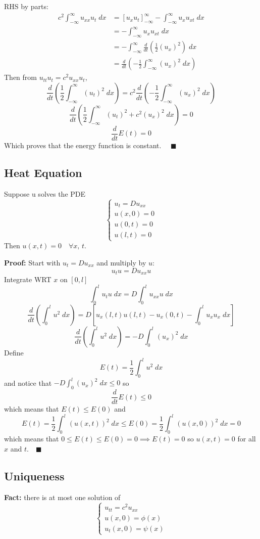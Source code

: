 \documentclass[12pt]{article}
\newcommand{\qed}{\quad \blacksquare}
\begin{document}
RHS by parts:
\begin{align*}
    c^2 \int_{-\infty}^{\infty} u_{xx} u_t \; dx &= [u_x u_t]_{-\infty}^\infty - \int_{-\infty}^{\infty} u_x u_{xt}\; dx\\
    &= -\int_{-\infty}^{\infty} u_x u_{xt} \; dx\\
    &= - \int_{-\infty}^{\infty} \frac{d}{dt}\left(\frac{1}{2}(u_x)^2\right)\; dx\\
    &= \frac{d}{dt}\left(-\frac{1}{2}\int_{-\infty}^{\infty} (u_x)^2\; dx\right)
\end{align*}
Then from $u_{tt} u_t = c^2u_{xx} u_t$,
\[\frac{d}{dt}\left(\frac{1}{2}\int_{-\infty}^{\infty} (u_t)^2 \; dx\right) = c^2 \frac{d}{dt}\left(-\frac{1}{2}\int_{-\infty}^{\infty} (u_x)^2\; dx\right)\]
\[\frac{d}{dt}\left(\frac{1}{2}\int_{-\infty}^{\infty} (u_t)^2 + c^2(u_x)^2 \; dx\right)= 0\]
\[\frac{d}{dt}E(t) = 0\]
Which proves that the energy function is constant. $\qed$

\subsection{Heat Equation}
Suppose u solves the PDE 
\[\begin{cases}
    u_t = Du_{xx}\\
    u(x, 0) = 0\\
    u(0, t) = 0\\
    u(l, t) = 0
\end{cases}\]
Then $u(x, t) = 0\quad \forall x,\, t$.

\textbf{Proof:}
Start with $u_t = Du_{xx}$ and multiply by $u$:
\[u_t u = Du_{xx} u\]
Integrate WRT $x$ on $[0, l]$ 
\[\int_0^l u_t u\; dx = D\int_0^l u_{xx}u \; dx\]
\[\frac{d}{dt} \left(\int_0^l u^2 \; dx\right) = D\left[u_x(l, t)u(l, t) - u_x(0, t) - \int_0^l u_x u_x \; dx\right]\] 
\[\frac{d}{dt} \left(\int_0^l u^2 \; dx\right) = -D\int_0^l (u_x)^2 \; dx\]
Define 
\[E(t) = \frac{1}{2}\int_0^l u^2 \; dx\]
and notice that $ -D\int_0^l (u_x)^2 \; dx \leq 0$ so 
\[\frac{d}{dt}E(t) \leq 0\] 
which means that $E(t) \leq E(0)$ and 
\[E(t) = \frac{1}{2}\int_0^l (u(x, t))^2 \; dx \leq E(0) = \frac{1}{2}\int_0^l(u(x, 0))^2\; dx = 0\]
which means that $0 \leq E(t) \leq E(0) = 0 \implies E(t)= 0$ so $u(x, t) = 0$ for all $x$ and $t. \qed$

\subsection{Uniqueness}
\textbf{Fact:} there is at most one solution of 
\[\begin{cases*}
    u_{tt} = c^2 u_{xx}\\
    u(x, 0) = \phi(x)\\
    u_t(x, 0) = \psi(x)
\end{cases*}\]
\end{document}
